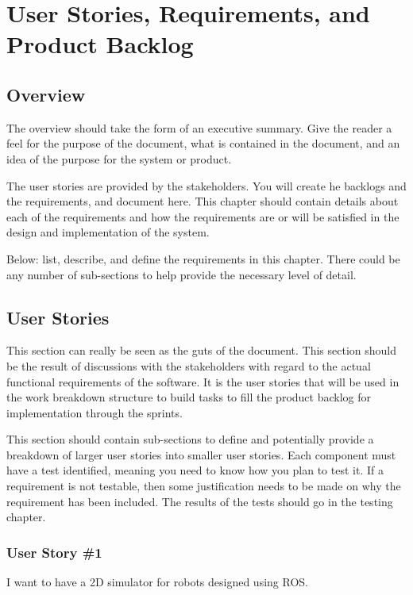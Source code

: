 
\chapter{User Stories,  Requirements, and Product Backlog}
\section{Overview}


The overview should take the form of an executive summary.  Give the reader a feel 
for the purpose of the document, what is contained in the document, and an idea 
of the purpose for the system or product. 

 The user stories 
are provided by the stakeholders.  You will create he backlogs and the requirements, and document here.  
This chapter should contain 
details about each of the requirements and how the requirements are or will be 
satisfied in the design and implementation of the system.

Below:   list, describe, and define the requirements in this chapter.  
There could be any number of sub-sections to help provide the necessary level of 
detail. 




\section{User Stories}
This section can really be seen as the guts of the document.  This section should 
be the result of discussions with the stakeholders with regard to the actual functional 
requirements of the software.  It is the user stories that will be used in the 
work breakdown structure to build tasks to fill the product backlog for implementation 
through the sprints.

This section should contain sub-sections to define and potentially provide a breakdown 
of larger user stories into smaller user stories.   Each component must have a test identified, 
meaning you need to know how you plan to test it.  If a requirement is not testable, then 
some justification needs to be made on why the requirement has been included.  
 The results of the tests should go in the testing chapter. 



\subsection{User Story \#1}
I want to have a 2D simulator for robots designed using ROS.

